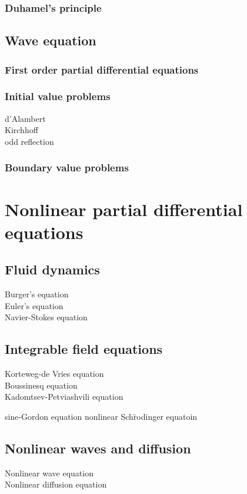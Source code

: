 \documentclass{../note}
\begin{document}
\section{Duhamel's principle}







\chapter{Wave equation}
\section{First order partial differential equations}
\section{Initial value problems}
d'Alambert\\
Kirchhoff\\
odd reflection

\section{Boundary value problems}







\part{Nonlinear partial differential equations}

\chapter{Fluid dynamics}
Burger's equation\\
Euler's equation\\
Navier-Stokes equation

\chapter{Integrable field equations}
Korteweg-de Vries equation\\
Boussinesq equation\\
Kadomtsev-Petviashvili equation

sine-Gordon equation
nonlinear Sch\"rodinger equatoin

\chapter{Nonlinear waves and diffusion}
Nonlinear wave equation\\
Nonlinear diffusion equation
\end{document}
